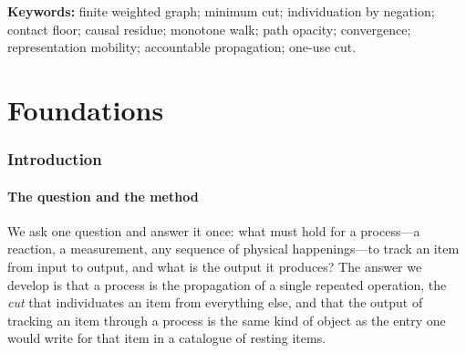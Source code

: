 \documentclass[11pt,a4paper]{article}
\theoremstyle{thmstyle}
\theoremstyle{definition}
\theoremstyle{remark}
\newcommand{\flo}{\beta}                 %
\begin{document}
\begin{abstract}
output; locally arbitrary, even ``impossible,'' intermediate steps are
permitted, and rejection is only on non-convergence). The output of the
table is shown to be the same kind of object as a cell of the periodic
catalogue of resting items: the catalogue is the table evaluated at the
resting contact, and the table is the catalogue under propagation. We
close by formalising the system's emblem, the single precise cut that can
be made once and dulls the cutter: a cut is a one-use committed edge whose
residue is deposited into the cutter as much as the cut, so no instrument
cuts cleanly and stays sharp---the perfect repeatable traceless cut is
exactly the $\flo=0$ object the floor forbids. Every claim is a theorem
about finite weighted graphs; all interpretation is confined to remarks on
which no theorem depends.
\end{abstract}

\noindent\textbf{Keywords:} finite weighted graph; minimum cut;
individuation by negation; contact floor; causal residue; monotone walk;
path opacity; convergence; representation mobility; accountable
propagation; one-use cut.

\tableofcontents

\part{Foundations}

\section{Introduction}
\label{sec:intro}

\subsection{The question and the method}

We ask one question and answer it once: what must hold for a process---a
reaction, a measurement, any sequence of physical happenings---to track an
item from input to output, and what is the output it produces? The answer
we develop is that a process is the propagation of a single repeated
operation, the \emph{cut} that individuates an item from everything else,
and that the output of tracking an item through a process is the same kind
of object as the entry one would write for that item in a catalogue of
resting items.
\end{document}
